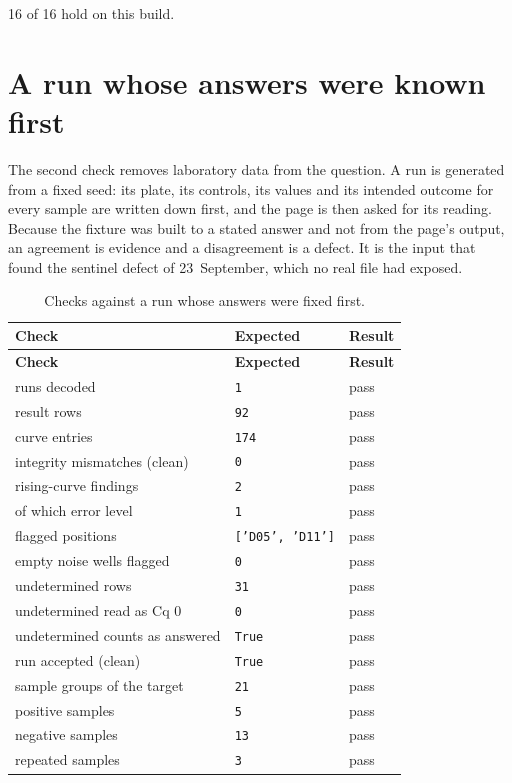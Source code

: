 \par 16 of 16 hold on this build.


\section{A run whose answers were known first}
The second check removes laboratory data from the question. A run is generated
from a fixed seed: its plate, its controls, its values and its intended outcome for
every sample are written down first, and the page is then asked for its reading.
Because the fixture was built to a stated answer and not from the page's output, an
agreement is evidence and a disagreement is a defect. It is the input that found
the sentinel defect of 23~September, which no real file had exposed.

{\small
\begin{xltabular}{\linewidth}{|X|l|l|}
\caption{Checks against a run whose answers were fixed first.}\label{tab:val-synthetic} \\
\toprule \textbf{Check} & \textbf{Expected} & \textbf{Result} \\\midrule\endfirsthead
\toprule \textbf{Check} & \textbf{Expected} & \textbf{Result} \\\midrule\endhead
runs decoded & \texttt{1} & pass \\
result rows & \texttt{92} & pass \\
curve entries & \texttt{174} & pass \\
integrity mismatches (clean) & \texttt{0} & pass \\
rising-curve findings & \texttt{2} & pass \\
of which error level & \texttt{1} & pass \\
flagged positions & \texttt{['D05', 'D11']} & pass \\
empty noise wells flagged & \texttt{0} & pass \\
undetermined rows & \texttt{31} & pass \\
undetermined read as Cq 0 & \texttt{0} & pass \\
undetermined counts as answered & \texttt{True} & pass \\
run accepted (clean) & \texttt{True} & pass \\
sample groups of the target & \texttt{21} & pass \\
positive samples & \texttt{5} & pass \\
negative samples & \texttt{13} & pass \\
repeated samples & \texttt{3} & pass \\

\end{xltabular}}
